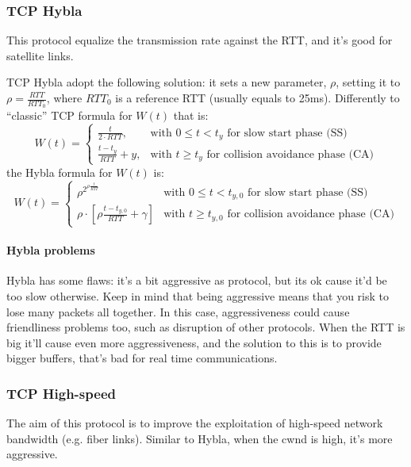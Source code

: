 \subsubsection{TCP Hybla}
\label{prt:tcp:hybla}

This protocol equalize the transmission rate against the RTT, and it's good for
satellite links.

TCP Hybla adopt the following solution: it sets a new parameter, $\rho$,
setting it to $\rho = \frac{RTT}{RTT_0}$, where $RTT_0$ is a reference RTT
(usually equals to 25ms).
Differently to ``classic'' TCP formula for $W(t)$ that is:
\begin{equation*}
  W(t) = \begin{cases}
    \frac{t}{2 \cdot RTT}, & \mbox{with } 0 \le t < t_y \mbox{ for slow start phase (SS)} \\
    \frac{t - t_y}{RTT} + y, & \mbox{with } t \ge t_y \mbox{ for collision avoidance phase (CA)}
  \end{cases}
\end{equation*}
the Hybla formula for $W(t)$ is:
\begin{equation}
  W(t) = \begin{cases}
    \rho^{2^{\rho \frac{t}{RTT}}} & \mbox{with } 0 \le t < t_{y,0} \mbox{ for slow start phase (SS)} \\
    \rho \cdot \left [\rho\frac{t - t_{y,0}}{RTT} + \gamma \right ] & \mbox{with } t \ge t_{y,0} \mbox{ for collision avoidance phase (CA)}
  \end{cases}
\end{equation}

\paragraph*{Hybla problems} Hybla has some flaws: it's a bit aggressive as
protocol, but its ok cause it'd be too slow otherwise. Keep in mind that being
aggressive means that you risk to lose many packets all together. In this case,
aggressiveness could cause friendliness problems too, such as disruption of
other protocols.
When the RTT is big it'll cause even more aggressiveness, and the solution to
this is to provide bigger buffers, that's bad for real time communications.

\subsubsection{TCP High-speed}
The aim of this protocol is to improve the exploitation of high-speed network
bandwidth (e.g. fiber links). Similar to Hybla, when the cwnd is high, it's
more aggressive.

